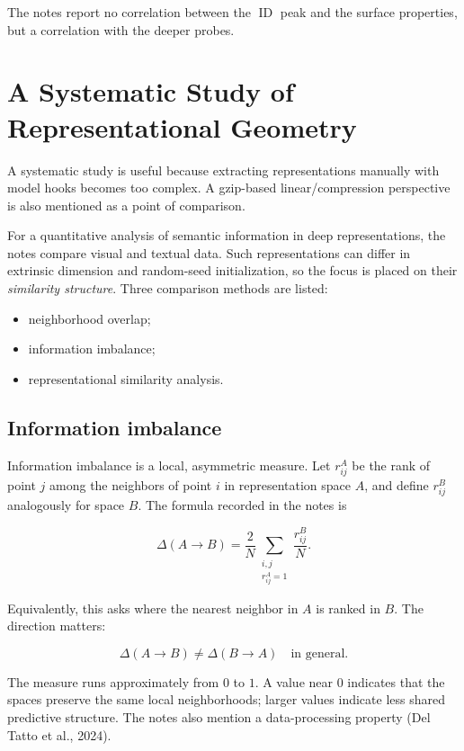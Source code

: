 \documentclass[11pt,a4paper]{article}
\newcommand{\ID}{\operatorname{ID}}
\begin{document}
The notes report no correlation between the $\ID$ peak and the surface
properties, but a correlation with the deeper probes.

\section{A Systematic Study of Representational Geometry}

A systematic study is useful because extracting representations manually with
model hooks becomes too complex. A gzip-based linear/compression perspective is
also mentioned as a point of comparison.

For a quantitative analysis of semantic information in deep representations,
the notes compare visual and textual data. Such representations can differ in
extrinsic dimension and random-seed initialization, so the focus is placed on
their \emph{similarity structure}. Three comparison methods are listed:

\begin{itemize}
  \item neighborhood overlap;
  \item information imbalance;
  \item representational similarity analysis.
\end{itemize}

\subsection{Information imbalance}

Information imbalance is a local, asymmetric measure. Let $r^A_{ij}$ be the
rank of point $j$ among the neighbors of point $i$ in representation space $A$,
and define $r^B_{ij}$ analogously for space $B$. The formula recorded in the
notes is

\[
  \Delta(A \to B)
  =
  \frac{2}{N}
  \sum_{\substack{i,j\\ r^A_{ij}=1}}
  \frac{r^B_{ij}}{N}.
\]

Equivalently, this asks where the nearest neighbor in $A$ is ranked in $B$.
The direction matters:

\[
  \Delta(A \to B) \neq \Delta(B \to A)
  \quad\text{in general}.
\]

The measure runs approximately from $0$ to $1$. A value near $0$ indicates
that the spaces preserve the same local neighborhoods; larger values indicate
less shared predictive structure. The notes also mention a data-processing
property (Del Tatto et al., 2024).
\end{document}
